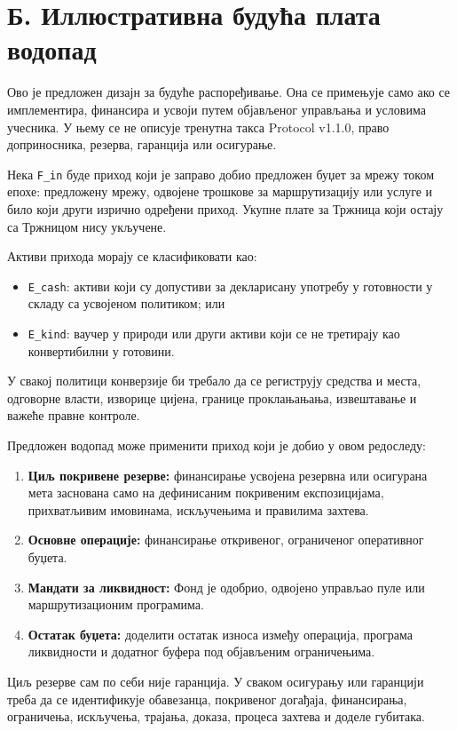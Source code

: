 \documentclass[11pt]{article}
\begin{document}
\section*{Б. Иллюстративна будућа плата водопад}

Ово је предложен дизајн за будуће распоређивање. Она се примењује само ако се имплементира, финансира и усвоји путем објављеног управљања и условима учесника. У њему се не описује тренутна такса Protocol v1.1.0, право доприносника, резерва, гаранција или осигурање.

Нека \texttt{F\_in} буде приход који је заправо добио предложен буџет за мрежу током епохе: предложену мрежу, одвојене трошкове за маршрутизацију или услуге и било који други изрично одређени приход. Укупне плате за Тржница који остају са Тржницом нису укључене.

Активи прихода морају се класификовати као:

\begin{itemize}[leftmargin=*]
\item \texttt{E\_cash}: активи који су допустиви за декларисану употребу у готовности у складу са усвојеном политиком; или
\item \texttt{E\_kind}: ваучер у природи или други активи који се не третирају као конвертибилни у готовини.
\end{itemize}
У свакој политици конверзије би требало да се региструју средства и места, одговорне власти, изворице цијена, границе проклањањања, извештавање и важеће правне контроле.

Предложен водопад може применити приход који је добио у овом редоследу:

\begin{enumerate}[leftmargin=*]
\item \textbf{Циљ покривене резерве:} финансирање усвојена резервна или осигурана мета заснована само на дефинисаним покривеним експозицијама, прихватљивим имовинама, искључењима и правилима захтева.
\item \textbf{Основне операције:} финансирање откривеног, ограниченог оперативног буџета.
\item \textbf{Мандати за ликвидност:} Фонд је одобрио, одвојено управљао пуле или маршрутизационим програмима.
\item \textbf{Остатак буџета:} доделити остатак износа између операција, програма ликвидности и додатног буфера под објављеним ограничењима.
\end{enumerate}
Циљ резерве сам по себи није гаранција. У сваком осигурању или гаранцији треба да се идентификује обавезанца, покривеног догађаја, финансирања, ограничења, искључења, трајања, доказа, процеса захтева и доделе губитака.
\end{document}
